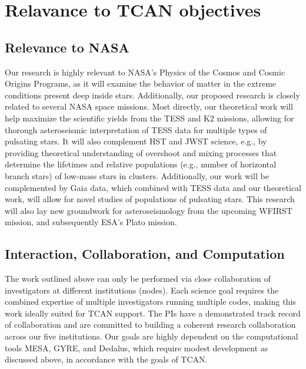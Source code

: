 
\section{Relavance to TCAN objectives}

\subsection{Relevance to NASA}


Our research is highly relevant to NASA's Physics of the Cosmos and Cosmic Origins Programs, as it will examine the behavior of matter in the extreme conditions present deep inside stars. Additionally, our proposed research is closely related to several NASA space missions. Most directly, our theoretical work will help maximize the scientific yields from the TESS and K2 missions, allowing for thorough asteroseismic interpretation of TESS data for multiple types of pulsating stars. It will also complement HST and JWST science, e.g., by providing theoretical understanding of overshoot and mixing processes that determine the lifetimes and relative populations (e.g., number of horizontal branch stars) of low-mass stars in clusters. Additionally, our work will be complemented by Gaia data, which combined with TESS data and our theoretical work, will allow for novel studies of populations of pulsating stars. This research will also lay new groundwork for asteroseismology from the upcoming WFIRST mission, and subsequently ESA's Plato mission. 


\subsection{Interaction, Collaboration, and Computation}

The work outlined above can only be performed via close collaboration of investigators at different institutions (nodes). Each science goal requires the combined expertise of multiple investigators running multiple codes, making this work ideally suited for TCAN support. The PIs have a demonstrated track record of collaboration and are committed to building a coherent research collaboration across our five institutions.  Our goals are highly dependent on the computational tools MESA, GYRE, and Dedalus, which require modest development as discussed above, in accordance with the goals of TCAN.




